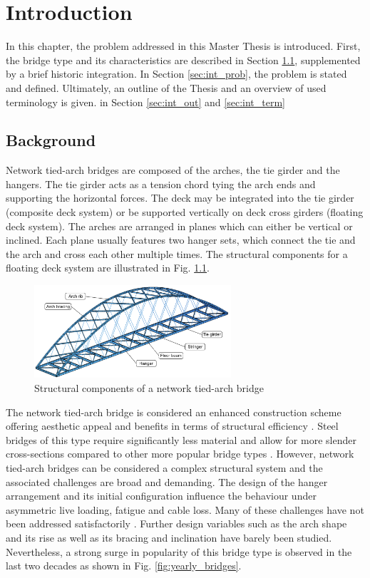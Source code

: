\chapter{Introduction}\label{sec:intro}
In this chapter, the problem addressed in this Master Thesis is introduced. First, the bridge type and its characteristics are described in Section \ref{sec:int_back}, supplemented by a brief historic integration. In Section \ref{sec:int_prob}, the problem is stated and defined. Ultimately, an outline of the Thesis and an overview of used terminology is given. in Section \ref{sec:int_out} and \ref{sec:int_term} 

\section{Background}\label{sec:int_back}
Network tied-arch bridges are composed of the arches, the tie girder and the hangers. The tie girder acts as a tension chord tying the arch ends and supporting the horizontal forces. The deck may be integrated into the tie girder (composite deck system) or be supported vertically on deck cross girders (floating deck system). The arches are arranged in planes which can either be vertical or inclined. Each plane usually features two hanger sets, which connect the tie and the arch and cross each other multiple times. The structural components for a floating deck system are illustrated in Fig. \ref{fig:components_illustration}.
\begin{figure}[H]
    \centering
    \includegraphics[width=0.65\textwidth]{overleaf/Pictures/illustration_components.PNG}
    \caption{Structural components of a network tied-arch bridge}
    \label{fig:components_illustration}
\end{figure}

The network tied-arch bridge is considered an enhanced construction scheme offering aesthetic appeal and benefits in terms of structural efficiency \cite{Hu}. Steel bridges of this type require significantly less material and allow for more slender cross-sections compared to other more popular bridge types \cite{Herzog}. However, network tied-arch bridges can be considered a complex structural system and the associated challenges are broad and demanding. 
The design of the hanger arrangement and its initial configuration influence the behaviour under asymmetric live loading, fatigue and cable loss. 
Many of these challenges have not been addressed satisfactorily \cite{Bruno}. Further design variables such as the arch shape and its rise as well as its bracing and inclination have barely been studied. Nevertheless, a strong surge in popularity of this bridge type is observed in the last two decades as shown in Fig. \ref{fig:yearly_bridges}.

